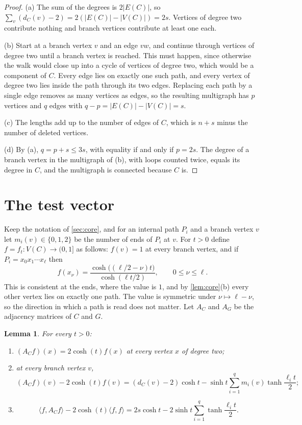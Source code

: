 \documentclass[11pt]{article}
\newtheorem{lemma}[theorem]{Lemma}
\theoremstyle{definition}
\theoremstyle{remark}
\begin{document}
\begin{proof}
(a) The sum of the degrees is $2|E(C)|$, so $\sum_v(d_C(v)-2)=2(|E(C)|-|V(C)|)=2s$. Vertices of degree two contribute
nothing and branch vertices contribute at least one each.

(b) Start at a branch vertex $v$ and an edge $vw$, and continue through vertices of degree two until a branch vertex is
reached. This must happen, since otherwise the walk would close up into a cycle of vertices of degree two, which would
be a component of $C$. Every edge lies on exactly one such path, and every vertex of degree two lies inside the path
through its two edges. Replacing each path by a single edge removes as many vertices as edges, so the resulting
multigraph has $p$ vertices and $q$ edges with $q-p=|E(C)|-|V(C)|=s$.

(c) The lengths add up to the number of edges of $C$, which is $n+s$ minus the number of deleted vertices.

(d) By (a), $q=p+s\le3s$, with equality if and only if $p=2s$. The degree of a branch vertex in the multigraph of (b),
with loops counted twice, equals its degree in $C$, and the multigraph is connected because $C$ is.
\end{proof}

\section{The test vector}\label{sec:test}

Keep the notation of \cref{sec:core}, and for an internal path $P_i$ and a branch vertex $v$ let $m_i(v)\in\{0,1,2\}$ be
the number of ends of $P_i$ at $v$. For $t>0$ define $f=f_t\colon V(C)\to(0,1]$ as follows: $f(v)=1$ at every branch
vertex, and if $P_i=x_0x_1\cdots x_\ell$ then
\begin{equation}\label{eq:f}
f(x_\nu)=\frac{\cosh\bigl((\ell/2-\nu)t\bigr)}{\cosh(\ell t/2)},\qquad 0\le \nu\le\ell .
\end{equation}
This is consistent at the ends, where the value is $1$, and by \cref{lem:core}(b) every other vertex lies on exactly one
path. The value is symmetric under $\nu\mapsto\ell-\nu$, so the direction in which a path is read does not matter. Let
$A_C$ and $A_G$ be the adjacency matrices of $C$ and $G$.

\begin{lemma}\label{lem:form}
For every $t>0$:
\begin{enumerate}[label=(\alph*)]
\item $(A_Cf)(x)=2\cosh(t)f(x)$ at every vertex $x$ of degree two;
\item at every branch vertex $v$,
\[
(A_Cf)(v)-2\cosh(t)f(v)=(d_C(v)-2)\cosh t-\sinh t\sum_{i=1}^q m_i(v)\tanh\frac{\ell_it}{2};
\]
\item
\begin{equation}\label{eq:form}
\langle f,A_Cf\rangle-2\cosh(t)\langle f,f\rangle=2s\cosh t-2\sinh t\sum_{i=1}^q\tanh\frac{\ell_it}{2}.
\end{equation}
\end{enumerate}
\end{lemma}
\end{document}
